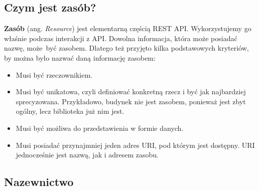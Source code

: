\documentclass[oneside,polski,logo,indent]{amuthesis}
\begin{document}
\begin{center}
\subsection{Czym jest zasób?}
\end{center}

\textbf{Zasób} (ang. \emph{Resource}) jest elementarną częścią REST API. Wykorzystujemy go właśnie podczas interakcji z API. Dowolna informacja, która może posiadać nazwę, może~być zasobem. Dlatego też przyjęto kilka podstawowych kryteriów, by można było nazwać daną informację zasobem:\newline


\begin{itemize}
\item Musi być rzeczownikiem.
\item Musi być unikatowa, czyli definiować konkretną rzecz i być jak najbardziej sprecyzowana. Przykładowo, budynek nie jest zasobem, ponieważ jest zbyt ogólny, lecz biblioteka już nim jest. 
\item Musi być możliwa do przedstawienia w formie danych.
\item Musi posiadać przynajmniej jeden adres URI, pod którym jest dostępny. URI jednocześnie jest nazwą, jak i adresem zasobu.\newline
\end{itemize}


\begin{center}
\subsection{Nazewnictwo}
\end{center}
\end{document}
